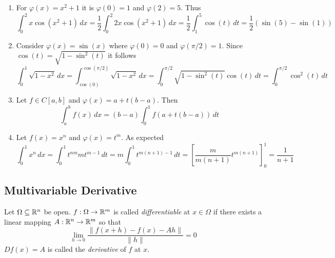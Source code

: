 \begin{examples}\hfill
    \begin{enumerate}
        \item For \( \varphi(x) = x^2 + 1 \) it is \( \varphi(0) = 1 \) and \( \varphi(2) = 5 \). Thus
              \[
                  \int_0^2 x\cos(x^2 + 1)\,dx
                  = \frac{1}{2} \int_0^2 2x\cos(x^2 + 1)\,dx
                  = \frac{1}{2} \int_1^5 \cos(t)\,dt
                  = \frac{1}{2} (\sin(5) - \sin(1))
              \]
        \item Consider \( \varphi(x) = \sin(x) \) where \( \varphi(0) = 0 \) and \( \varphi(\pi / 2) = 1 \).
              Since \( \cos(t) = \sqrt{1 - \sin^2(t)} \) it follows
              \[
                  \int_0^1 \sqrt{1 - x^2}\,dx
                  = \int_{\cos(0)}^{\cos(\pi/2)} \sqrt{1 - x^2}\,dx
                  = \int_0^{\pi/2} \sqrt{1 - \sin^2(t)}\cos(t)\,dt
                  = \int_0^{\pi/2} \cos^2(t)\,dt
              \]
        \item Let \(f \in C[a,b] \) and \( \varphi(x) = a + t(b - a) \). Then
              \[
                  \int_a^b f(x)\,dx = (b - a)\int_0^1 f(a + t(b - a))\,dt
              \]
        \item Let \(f(x) = x^n \) and \( \varphi(x) = t^m \). As expected
              \[
                  \int_0^1 x^n\,dx
                  = \int_0^1 t^{nm} m t^{m - 1}\,dt
                  = m\int_0^1 t^{m(n + 1) - 1}\,dt
                      = {\left[\frac{m}{m(n + 1)} t^{m(n + 1)}\right]}_0^1
                  = \frac{1}{n + 1}
              \]
    \end{enumerate}
\end{examples}
\bigskip


\subsection{Multivariable Derivative}
\bigskip

\begin{definition}
    Let \( \Omega \subseteq \mathbb{R}^n \) be open. \( f : \Omega \to \mathbb{R}^m \) is called \emph{differentiable}
    at \( x \in \Omega \) if there exists a linear mapping \( A: \mathbb{R}^n \to \mathbb{R}^m \) so that
    \[
        \lim_{h \to 0} \frac{\|f(x + h) - f(x) - Ah\|}{\|h\|} = 0
    \]
    \( Df(x) = A \) is called the \emph{derivative} of \( f \) at \( x \).
\end{definition}
\bigskip


